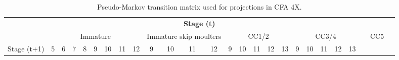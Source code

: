 \documentclass[11pt]{article}
\begin{document}
\begin{landscape}
\begin{table}[!tbp]
 \caption{Pseudo-Markov transition matrix used for projections in CFA 4X.\label{tm.4x}} 
 \begin{center}
\begin{scriptsize}
 \begin{tabular}{llllllllllllllllllllllllllll}\hline\hline
\multicolumn{28}{c}{\bfseries Stage (t)}
\\ 
\multicolumn{1}{c}{ }&
\multicolumn{8}{c}{Immature}&
\multicolumn{4}{c}{Immature skip moulters}&
\multicolumn{5}{c}{CC1/2}&
\multicolumn{5}{c}{CC3/4}&
\multicolumn{5}{c}{CC5}
\\
\multicolumn{1}{c}{Stage (t+1)}&
\multicolumn{1}{c}{5}&
\multicolumn{1}{c}{6}&
\multicolumn{1}{c}{7}&
\multicolumn{1}{c}{8}&
\multicolumn{1}{c}{9}&
\multicolumn{1}{c}{10}&
\multicolumn{1}{c}{11}&
\multicolumn{1}{c}{12}&
\multicolumn{1}{c}{9}&
\multicolumn{1}{c}{10}&
\multicolumn{1}{c}{11}&
\multicolumn{1}{c}{12}&
\multicolumn{1}{c}{9}&
\multicolumn{1}{c}{10}&
\multicolumn{1}{c}{11}&
\multicolumn{1}{c}{12}&
\multicolumn{1}{c}{13}&
\multicolumn{1}{c}{9}&
\multicolumn{1}{c}{10}&
\multicolumn{1}{c}{11}&
\multicolumn{1}{c}{12}&
\multicolumn{1}{c}{13}

 \\ \hline


\end{tabular}
\end{scriptsize}
\end{center}
\end{table}
\end{landscape}
\end{document}
